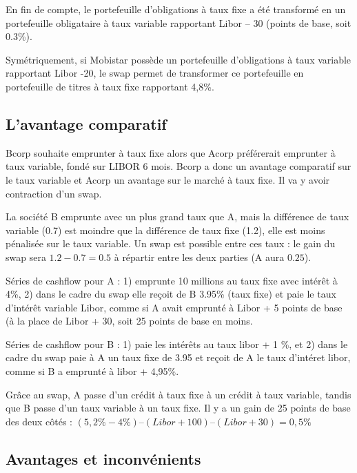 	
	En fin de compte, le portefeuille d'obligations à taux fixe a été transformé en un portefeuille obligataire à taux variable rapportant Libor – 30 (points de base, soit 0.3\%). 

	Symétriquement, si Mobistar possède un portefeuille d'obligations à taux variable rapportant Libor -20, le swap permet de transformer ce portefeuille en portefeuille de titres à taux fixe rapportant 4,8\%.
	
	\subsection{L'avantage comparatif}
	
	
	Bcorp souhaite emprunter à taux fixe alors que Acorp préférerait emprunter à taux variable, fondé sur LIBOR 6 mois. Bcorp a donc un avantage comparatif sur le taux variable et Acorp un avantage sur le marché à taux fixe. Il va y avoir contraction d'un swap.
	
	La société B emprunte avec un plus grand taux que A, mais la différence de taux variable (0.7) est moindre que la différence de taux fixe (1.2), elle est moins pénalisée sur le taux variable. Un swap est possible entre ces taux : le gain du swap sera $1.2 - 0.7 = 0.5$ à répartir entre les deux parties (A aura $0.25$).
	
	Séries de cashflow pour A : 1) emprunte 10 millions au taux fixe avec intérêt à 4\%, 2) dans le cadre du swap elle reçoit de B 3.95\% (taux fixe) et paie le taux d'intérêt variable Libor, comme si A avait emprunté à Libor + 5 points de base (à la place de Libor + 30, soit 25 points de base en moins.
	
	Séries de cashflow pour B : 1) paie les intérêts au taux libor + 1 \%, et 2) dans le cadre du swap paie à A un taux fixe de 3.95 et reçoit de A le taux d'intéret libor, comme si B a emprunté à libor + 4,95\%.
	

	Grâce au swap, A passe d'un crédit à taux fixe à un crédit à taux variable, tandis que B passe d'un taux variable à un taux fixe. Il y a un gain de 25 points de base des deux côtés : $(5,2\%-4\%) – (Libor + 100) – (Libor + 30) = 0,5\%$
	
	\subsection{Avantages et inconvénients}
	
